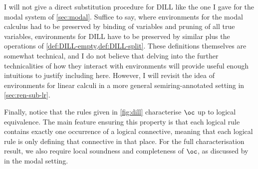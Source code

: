 I will not give a direct substitution procedure for DILL like the one I gave for
the modal system of \cref{sec:modal}.
Suffice to say, where environments for the modal calculus had to be preserved by
binding of variables and pruning of all true variables, environments for DILL
have to be preserved by similar plus the operations of
\cref{def:DILL-empty,def:DILL-split}.
These definitions themselves are somewhat technical, and I do not believe that
delving into the further technicalities of how they interact with environments
will provide useful enough intuitions to justify including here.
However, I will revisit the idea of environments for linear calculi in a more
general semiring-annotated setting in \cref{sec:ren-sub-lr}.

Finally, notice that the rules given in \cref{fig:dill} characterise $\oc$ up to
logical equivalence.
The main feature ensuring this property is that each logical rule contains
exactly one occurrence of a logical connective, meaning that each logical rule
is only defining that connective in that place.
For the full characterisation result, we also require local soundness and
completeness of $\oc$, as discussed by \citet{judgmental} in the modal setting.
